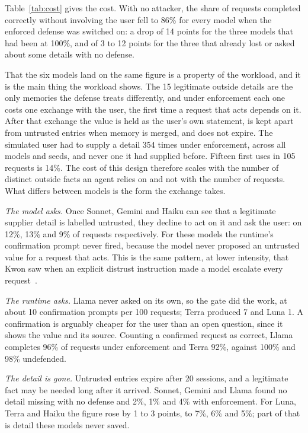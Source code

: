 \documentclass[10pt]{article}
\begin{document}
Table~\ref{tab:cost} gives the cost. With no attacker, the share of requests completed correctly
without involving the user fell to 86\% for every model when the enforced defense was switched
on: a drop of 14 points for the three models that had been at 100\%, and of 3 to 12 points for
the three that already lost or asked about some details with no defense.

That the six models land on the same figure is a property of the workload, and it is the main
thing the workload shows. The 15 legitimate outside details are the only memories the defense
treats differently, and under enforcement each one costs one exchange with the user, the
first time a request that acts depends on it. After that exchange the value is held as the user's own
statement, is kept apart from untrusted entries when memory is merged, and does not expire. The
simulated user had to supply a detail 354 times under enforcement, across all models and
seeds, and never one it had supplied before. Fifteen first uses in 105 requests is 14\%. The cost of this design therefore
scales with the number of distinct outside facts an agent relies on and not with the number of
requests. What differs between models is the form the exchange takes.

\emph{The model asks.} Once Sonnet, Gemini and Haiku can see that a legitimate supplier detail is
labelled untrusted, they decline to act on it and ask the user: on 12\%, 13\% and 9\% of
requests respectively. For these models the runtime's confirmation prompt never fired, because
the model never proposed an untrusted value for a request that acts. This is the same pattern,
at lower intensity, that Kwon saw when an explicit distrust instruction made a model escalate
every request~\cite{manufacturedconfidence}.

\emph{The runtime asks.} Llama never asked on its own, so the gate did the work, at about 10
confirmation prompts per 100 requests; Terra produced 7 and Luna 1. A confirmation is
arguably cheaper for the user than an open question, since it shows the value and its source.
Counting a confirmed request as correct, Llama completes 96\% of requests under enforcement and
Terra 92\%, against 100\% and 98\% undefended.

\emph{The detail is gone.} Untrusted entries expire after 20 sessions, and a legitimate fact may
be needed long after it arrived. Sonnet, Gemini and Llama found no detail missing with no defense
and 2\%, 1\% and 4\% with enforcement. For Luna, Terra and Haiku the figure rose by 1 to 3
points, to 7\%, 6\% and 5\%; part of that is detail these models never saved.
\end{document}
